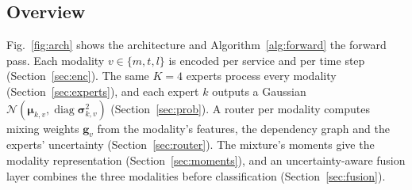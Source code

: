 \documentclass[journal]{IEEEtran}
\begin{document}
\subsection{Overview}
Fig.~\ref{fig:arch} shows the architecture and Algorithm~\ref{alg:forward} the forward pass. Each modality
$v\in\{m,t,l\}$ is encoded per service and per time step (Section~\ref{sec:enc}). The same $K=4$ experts
process every modality (Section~\ref{sec:experts}), and each expert $k$ outputs a Gaussian
$\mathcal{N}(\bm{\mu}_{k,v},\operatorname{diag}\bm{\sigma}^2_{k,v})$ (Section~\ref{sec:prob}). A router per
modality computes mixing weights $\bm{g}_v$ from the modality's features, the dependency graph and the
experts' uncertainty (Section~\ref{sec:router}). The mixture's moments give the modality representation
(Section~\ref{sec:moments}), and an uncertainty-aware fusion layer combines the three modalities before
classification (Section~\ref{sec:fusion}).
\end{document}

